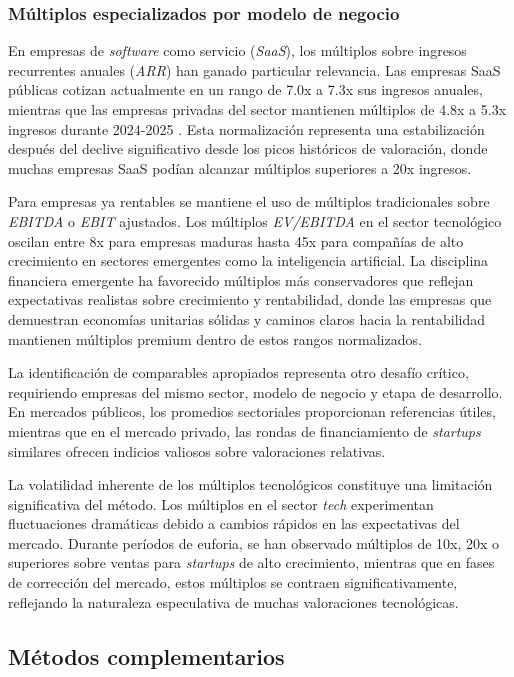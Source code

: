 \subsubsection{Múltiplos especializados por modelo de negocio}

En empresas de \emph{software} como servicio (\emph{SaaS}), los múltiplos sobre ingresos recurrentes anuales (\emph{ARR}) han ganado particular relevancia. Las empresas SaaS públicas cotizan actualmente en un rango de 7.0x a 7.3x sus ingresos anuales, mientras que las empresas privadas del sector mantienen múltiplos de 4.8x a 5.3x ingresos durante 2024-2025 \citep{saasmetrics2024}. Esta normalización representa una estabilización después del declive significativo desde los picos históricos de valoración, donde muchas empresas SaaS podían alcanzar múltiplos superiores a 20x ingresos.

Para empresas ya rentables se mantiene el uso de múltiplos tradicionales sobre \emph{EBITDA} o \emph{EBIT} ajustados. Los múltiplos \emph{EV/EBITDA} en el sector tecnológico oscilan entre 8x para empresas maduras hasta 45x para compañías de alto crecimiento en sectores emergentes como la inteligencia artificial. La disciplina financiera emergente ha favorecido múltiplos más conservadores que reflejan expectativas realistas sobre crecimiento y rentabilidad, donde las empresas que demuestran economías unitarias sólidas y caminos claros hacia la rentabilidad mantienen múltiplos premium dentro de estos rangos normalizados.

La identificación de comparables apropiados representa otro desafío crítico, requiriendo empresas del mismo sector, modelo de negocio y etapa de desarrollo. En mercados públicos, los promedios sectoriales proporcionan referencias útiles, mientras que en el mercado privado, las rondas de financiamiento de \emph{startups} similares ofrecen indicios valiosos sobre valoraciones relativas.

La volatilidad inherente de los múltiplos tecnológicos constituye una limitación significativa del método. Los múltiplos en el sector \emph{tech} experimentan fluctuaciones dramáticas debido a cambios rápidos en las expectativas del mercado. Durante períodos de euforia, se han observado múltiplos de 10x, 20x o superiores sobre ventas para \emph{startups} de alto crecimiento, mientras que en fases de corrección del mercado, estos múltiplos se contraen significativamente, reflejando la naturaleza especulativa de muchas valoraciones tecnológicas.

\subsection{Métodos complementarios}

